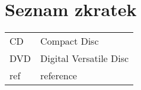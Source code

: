 \section*{Seznam zkratek}
\vspace{2em}

\begin{tabular}{@{}ll@{}}
CD & Compact Disc\\
DVD & Digital Versatile Disc\\
ref & reference
\end{tabular}



